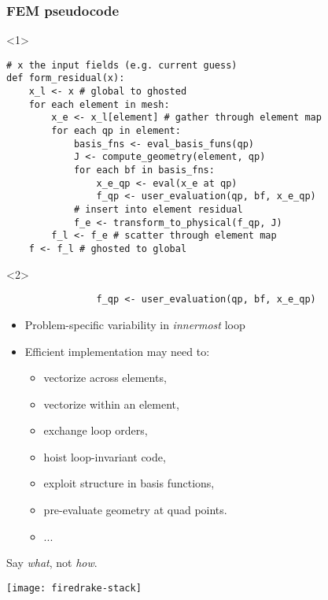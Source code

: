 \documentclass[presentation]{beamer}
\begin{document}
\begin{frame}[fragile]
  \frametitle{FEM pseudocode}
  \begin{onlyenv}<1>
\begin{verbatim}
# x the input fields (e.g. current guess)
def form_residual(x):
    x_l <- x # global to ghosted
    for each element in mesh:
        x_e <- x_l[element] # gather through element map
        for each qp in element:
            basis_fns <- eval_basis_funs(qp)
            J <- compute_geometry(element, qp)
            for each bf in basis_fns:
                x_e_qp <- eval(x_e at qp)
                f_qp <- user_evaluation(qp, bf, x_e_qp)
            # insert into element residual
            f_e <- transform_to_physical(f_qp, J)
        f_l <- f_e # scatter through element map
    f <- f_l # ghosted to global
\end{verbatim}
  \end{onlyenv}

  \begin{onlyenv}<2>
\begin{verbatim}
                f_qp <- user_evaluation(qp, bf, x_e_qp)
\end{verbatim}
    \begin{itemize}
    \item Problem-specific variability in \emph{innermost} loop
    \item Efficient implementation may need to:
      \begin{itemize}
      \item vectorize across elements,
      \item vectorize within an element,
      \item exchange loop orders,
      \item hoist loop-invariant code,
      \item exploit structure in basis functions,
      \item pre-evaluate geometry at quad points.
      \item ...
      \end{itemize}
    \end{itemize}
  \end{onlyenv}
\end{frame}

\begin{frame}[standout]
  Say \emph{what}, not \emph{how}.
\end{frame}

\begin{frame}
  \texttt{[image: firedrake-stack]}
\end{frame}
\end{document}
